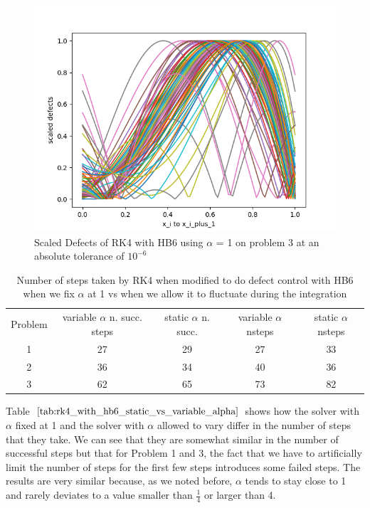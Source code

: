 \documentclass{article}
\begin{document}
\begin{figure}[H]
\centering
\includegraphics[width=0.7\linewidth]{./figures/static_alpha_rk4_with_hb6_p3_scaled_defects}
\caption{Scaled Defects of RK4 with HB6 using $\alpha$ = 1 on problem 3 at an absolute tolerance of $10^{-6}$}
\label{fig:static_alpha_rk4_with_hb6_p3_scaled_defects}
\end{figure}

\begin{table}[h]
\caption {Number of steps taken by RK4 when modified to do defect control with HB6 when we fix $\alpha$ at 1 vs when we allow it to fluctuate during the integration} \label{tab:rk4_with_hb6_static_vs_variable_alpha}
\begin{center}
\begin{tabular}{ c c c c c } 
Problem & variable $\alpha$ n. succ. steps & static $\alpha$ n. succ. & variable $\alpha$ nsteps & static $\alpha$ nsteps \\ 
1       & 27                      &        29               & 27         & 33\\ 
2       & 36                      &        34               & 40         & 36\\
3       & 62                      &        65               & 73         & 82\\
\end{tabular}
\end{center}
\end{table}

Table $\ref{tab:rk4_with_hb6_static_vs_variable_alpha}$ shows how the solver with $\alpha$ fixed at 1 and the solver with $\alpha$ allowed to vary differ in the number of steps that they take. We can see that they are somewhat similar in the number of successful steps but that for Problem 1 and 3, the fact that we have to artificially limit the number of steps for the first few steps introduces some failed steps. The results are very similar because, as we noted before, $\alpha$ tends to stay close to 1 and rarely deviates to a value smaller than $\frac{1}{4}$ or larger than 4.
\end{document}
